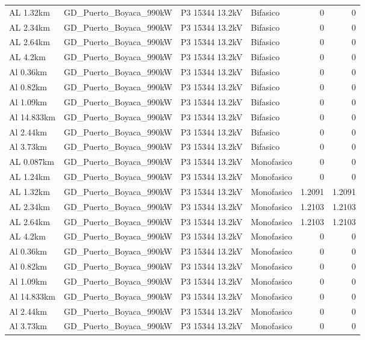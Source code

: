 \documentclass[11pt,a4paper]{article}
\begin{document}
\begin{longtable}{llllrr}
AL 1.32km & GD\_Puerto\_Boyaca\_990kW & P3 15344 13.2kV & Bifasico & 0 & 0 \\
AL 2.34km & GD\_Puerto\_Boyaca\_990kW & P3 15344 13.2kV & Bifasico & 0 & 0 \\
AL 2.64km & GD\_Puerto\_Boyaca\_990kW & P3 15344 13.2kV & Bifasico & 0 & 0 \\
AL 4.2km & GD\_Puerto\_Boyaca\_990kW & P3 15344 13.2kV & Bifasico & 0 & 0 \\
Al 0.36km & GD\_Puerto\_Boyaca\_990kW & P3 15344 13.2kV & Bifasico & 0 & 0 \\
Al 0.82km & GD\_Puerto\_Boyaca\_990kW & P3 15344 13.2kV & Bifasico & 0 & 0 \\
Al 1.09km & GD\_Puerto\_Boyaca\_990kW & P3 15344 13.2kV & Bifasico & 0 & 0 \\
Al 14.833km & GD\_Puerto\_Boyaca\_990kW & P3 15344 13.2kV & Bifasico & 0 & 0 \\
Al 2.44km & GD\_Puerto\_Boyaca\_990kW & P3 15344 13.2kV & Bifasico & 0 & 0 \\
Al 3.73km & GD\_Puerto\_Boyaca\_990kW & P3 15344 13.2kV & Bifasico & 0 & 0 \\
AL 0.087km & GD\_Puerto\_Boyaca\_990kW & P3 15344 13.2kV & Monofasico & 0 & 0 \\
AL 1.24km & GD\_Puerto\_Boyaca\_990kW & P3 15344 13.2kV & Monofasico & 0 & 0 \\
AL 1.32km & GD\_Puerto\_Boyaca\_990kW & P3 15344 13.2kV & Monofasico & 1.2091 & 1.2091 \\
AL 2.34km & GD\_Puerto\_Boyaca\_990kW & P3 15344 13.2kV & Monofasico & 1.2103 & 1.2103 \\
AL 2.64km & GD\_Puerto\_Boyaca\_990kW & P3 15344 13.2kV & Monofasico & 1.2103 & 1.2103 \\
AL 4.2km & GD\_Puerto\_Boyaca\_990kW & P3 15344 13.2kV & Monofasico & 0 & 0 \\
Al 0.36km & GD\_Puerto\_Boyaca\_990kW & P3 15344 13.2kV & Monofasico & 0 & 0 \\
Al 0.82km & GD\_Puerto\_Boyaca\_990kW & P3 15344 13.2kV & Monofasico & 0 & 0 \\
Al 1.09km & GD\_Puerto\_Boyaca\_990kW & P3 15344 13.2kV & Monofasico & 0 & 0 \\
Al 14.833km & GD\_Puerto\_Boyaca\_990kW & P3 15344 13.2kV & Monofasico & 0 & 0 \\
Al 2.44km & GD\_Puerto\_Boyaca\_990kW & P3 15344 13.2kV & Monofasico & 0 & 0 \\
Al 3.73km & GD\_Puerto\_Boyaca\_990kW & P3 15344 13.2kV & Monofasico & 0 & 0 \\

\end{longtable}
\end{document}
